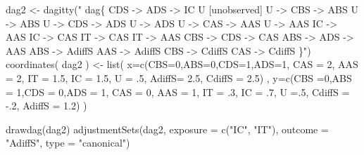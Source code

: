 \documentclass[
  10pt,
  dvipsnames,enabledeprecatedfontcommands]{scrartcl}
\newenvironment{Shaded}{\begin{snugshade}}{\end{snugshade}}
\newcommand{\AttributeTok}[1]{\textcolor[rgb]{0.77,0.63,0.00}{#1}}
\newcommand{\DecValTok}[1]{\textcolor[rgb]{0.00,0.00,0.81}{#1}}
\newcommand{\FloatTok}[1]{\textcolor[rgb]{0.00,0.00,0.81}{#1}}
\newcommand{\FunctionTok}[1]{\textcolor[rgb]{0.00,0.00,0.00}{#1}}
\newcommand{\NormalTok}[1]{#1}
\newcommand{\OtherTok}[1]{\textcolor[rgb]{0.56,0.35,0.01}{#1}}
\newcommand{\SpecialCharTok}[1]{\textcolor[rgb]{0.00,0.00,0.00}{#1}}
\newcommand{\StringTok}[1]{\textcolor[rgb]{0.31,0.60,0.02}{#1}}
\begin{document}
\begin{Shaded}
\begin{Highlighting}[]
\NormalTok{dag2 }\OtherTok{\textless{}{-}} \FunctionTok{dagitty}\NormalTok{(}\StringTok{"}
\StringTok{  dag\{}
\StringTok{                CDS {-}\textgreater{} ADS {-}\textgreater{} IC  }
\StringTok{                U [unobserved]   }
\StringTok{                U {-}\textgreater{} CBS {-}\textgreater{} ABS  }
\StringTok{                U {-}\textgreater{} ABS        }
\StringTok{                U {-}\textgreater{} CDS {-}\textgreater{} ADS  }
\StringTok{                U {-}\textgreater{} ADS         }
\StringTok{                U {-}\textgreater{} CAS {-}\textgreater{} AAS    }
\StringTok{                U {-}\textgreater{} AAS                        }
\StringTok{                IC {-}\textgreater{} AAS        }
\StringTok{                IC {-}\textgreater{} CAS        }
\StringTok{                IT {-}\textgreater{} CAS        }
\StringTok{                IT {-}\textgreater{} AAS}
\StringTok{                CBS {-}\textgreater{} CDS {-}\textgreater{} CAS}
\StringTok{                ABS {-}\textgreater{} ADS {-}\textgreater{} AAS}
\StringTok{                ABS {-}\textgreater{} AdiffS}
\StringTok{                AAS {-}\textgreater{} AdiffS}
\StringTok{                CBS {-}\textgreater{} CdiffS}
\StringTok{                CAS {-}\textgreater{} CdiffS}
\StringTok{                \}"}\NormalTok{)}
\FunctionTok{coordinates}\NormalTok{( dag2 ) }\OtherTok{\textless{}{-}} \FunctionTok{list}\NormalTok{( }\AttributeTok{x=}\FunctionTok{c}\NormalTok{(}\AttributeTok{CBS=}\DecValTok{0}\NormalTok{,}\AttributeTok{ABS=}\DecValTok{0}\NormalTok{,}\AttributeTok{CDS=}\DecValTok{1}\NormalTok{,}\AttributeTok{ADS=}\DecValTok{1}\NormalTok{,}
    \AttributeTok{CAS =} \DecValTok{2}\NormalTok{, }\AttributeTok{AAS =} \DecValTok{2}\NormalTok{, }\AttributeTok{IT =} \FloatTok{1.5}\NormalTok{, }\AttributeTok{IC =} \FloatTok{1.5}\NormalTok{, }\AttributeTok{U =}\NormalTok{ .}\DecValTok{5}\NormalTok{, }\AttributeTok{AdiffS=} \FloatTok{2.5}\NormalTok{, }\AttributeTok{CdiffS =} \FloatTok{2.5}\NormalTok{) ,}
\AttributeTok{y=}\FunctionTok{c}\NormalTok{(}\AttributeTok{CBS =}\DecValTok{0}\NormalTok{,}\AttributeTok{ABS =} \DecValTok{1}\NormalTok{,}\AttributeTok{CDS =} \DecValTok{0}\NormalTok{,}\AttributeTok{ADS =} \DecValTok{1}\NormalTok{, }\AttributeTok{CAS =} \DecValTok{0}\NormalTok{, }\AttributeTok{AAS =} \DecValTok{1}\NormalTok{, }\AttributeTok{IT =}\NormalTok{ .}\DecValTok{3}\NormalTok{, }\AttributeTok{IC =}\NormalTok{ .}\DecValTok{7}\NormalTok{, }\AttributeTok{U =}\NormalTok{.}\DecValTok{5}\NormalTok{, }\AttributeTok{CdiffS =} \SpecialCharTok{{-}}\NormalTok{.}\DecValTok{2}\NormalTok{,  }\AttributeTok{AdiffS =} \FloatTok{1.2}\NormalTok{) )}

\FunctionTok{drawdag}\NormalTok{(dag2)}
\FunctionTok{adjustmentSets}\NormalTok{(dag2, }\AttributeTok{exposure =} \FunctionTok{c}\NormalTok{(}\StringTok{"IC"}\NormalTok{, }\StringTok{"IT"}\NormalTok{), }\AttributeTok{outcome =} \StringTok{"AdiffS"}\NormalTok{, }\AttributeTok{type =} \StringTok{"canonical"}\NormalTok{)}
\end{Highlighting}
\end{Shaded}
\end{document}
